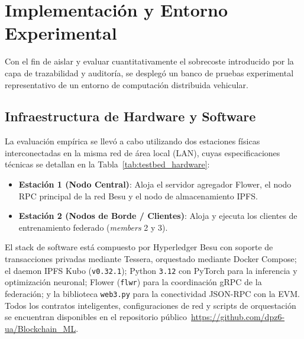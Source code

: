 \section{Implementación y Entorno Experimental}
\label{sec:implementacion}

Con el fin de aislar y evaluar cuantitativamente el sobrecoste introducido por la capa de trazabilidad y auditoría, se desplegó un banco de pruebas experimental representativo de un entorno de computación distribuida vehicular.

\subsection{Infraestructura de Hardware y Software}
La evaluación empírica se llevó a cabo utilizando dos estaciones físicas interconectadas en la misma red de área local (LAN), cuyas especificaciones técnicas se detallan en la Tabla~\ref{tab:testbed_hardware}:
\begin{itemize}
    \item \textbf{Estación 1 (Nodo Central)}: Aloja el servidor agregador Flower, el nodo RPC principal de la red Besu y el nodo de almacenamiento IPFS.
    \item \textbf{Estación 2 (Nodos de Borde / Clientes)}: Aloja y ejecuta los clientes de entrenamiento federado (\textit{members} 2 y 3).
\end{itemize}

\begin{table}[H]
\centering
\caption{Especificaciones del banco de pruebas experimental.}
\label{tab:testbed_hardware}
\end{table}

El stack de software está compuesto por Hyperledger Besu con soporte de transacciones privadas mediante Tessera, orquestado mediante Docker Compose; el daemon IPFS Kubo (\texttt{v0.32.1}); Python \texttt{3.12} con PyTorch para la inferencia y optimización neuronal; Flower (\texttt{flwr}) para la coordinación gRPC de la federación; y la biblioteca \texttt{web3.py} para la conectividad JSON-RPC con la EVM. Todos los contratos inteligentes, configuraciones de red y scripts de orquestación se encuentran disponibles en el repositorio público~\url{https://github.com/dpz6-ua/Blockchain_ML}.
\\

